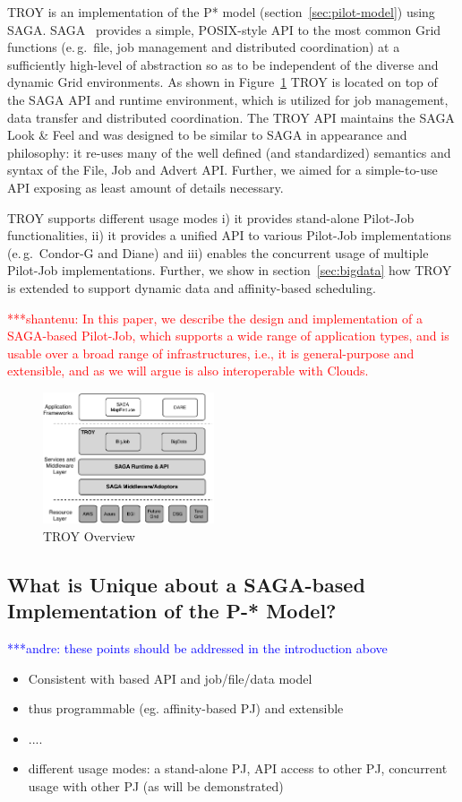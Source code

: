 \documentclass[conference,final]{IEEEtran}
\newcommand{\jhanote}[1]{ {\textcolor{red} { ***shantenu: #1 }}}
\newcommand{\alnote}[1]{ {\textcolor{blue} { ***andre: #1 }}}
\newcommand{\alnote}[1]{}
\newcommand{\jhanote}[1]{}
\begin{document}
TROY is an implementation of the P* model (section~\ref{sec:pilot-model}) using
SAGA. SAGA~\cite{saga_url,saga_gfd90} provides a simple, POSIX-style API to the
most common Grid functions (e.\,g.\ file, job management and distributed 
coordination) at a sufficiently high-level of abstraction so as to
be independent of the diverse and dynamic Grid environments. As shown in
Figure~\ref{fig:figures_troy} TROY is located on top of the SAGA API
and runtime environment, which is utilized for job management, data transfer and
distributed coordination. The TROY API maintains the SAGA Look \& Feel and was
designed to be similar to SAGA in appearance and philosophy: it re-uses many of
the well defined (and standardized) semantics and syntax of the File, Job and
Advert API. Further, we aimed for a simple-to-use API exposing as least amount
of details necessary. 

TROY supports different usage modes i) it provides stand-alone
Pilot-Job functionalities, ii) it provides a unified API to various
Pilot-Job implementations (e.\,g.\ Condor-G and Diane) and iii)
enables the concurrent usage of multiple Pilot-Job
implementations. Further, we show in section~\ref{sec:bigdata} how
TROY is extended to support dynamic data and affinity-based
scheduling.

\jhanote{In this paper, we describe the design and implementation of a
  SAGA-based Pilot-Job, which supports a wide range of application
  types, and is usable over a broad range of infrastructures, i.e., it
  is general-purpose and extensible, and as we will argue is also
  interoperable with Clouds.}
 

\begin{figure}[htbp]
	\centering
		\includegraphics[width=0.45\textwidth]{figures/troy.pdf}
	\caption{TROY Overview}
	\label{fig:figures_troy}
\end{figure}


\subsection{What is Unique about a SAGA-based Implementation of the
  P-* Model?}
\alnote{these points should be addressed in the introduction above}
\begin{itemize}
\item Consistent with based API and job/file/data model
\item thus programmable (eg. affinity-based PJ) and extensible 
\item ....
\item different usage modes: a stand-alone PJ, API access to other PJ,
  concurrent usage with other PJ (as will be demonstrated)
\end{itemize}
\end{document}
